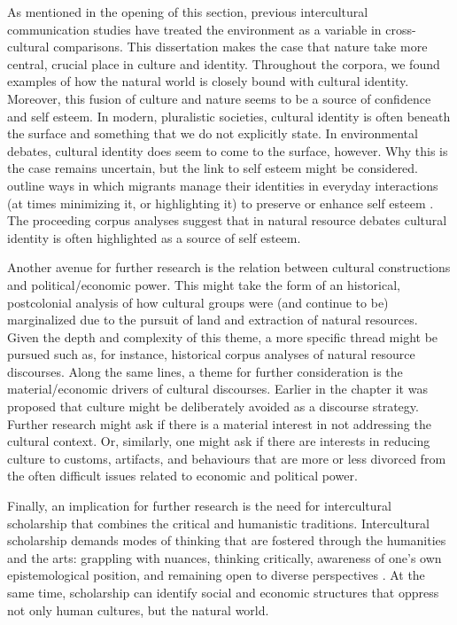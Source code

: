As mentioned in the opening of this section, previous intercultural communication studies have treated the environment as a variable in cross-cultural comparisons. This dissertation makes the case that nature take more central, crucial place in culture and identity. Throughout the corpora, we found examples of how the natural world is closely bound with cultural identity. Moreover, this fusion of culture and nature seems to be a source of confidence and self esteem. In modern, pluralistic societies, cultural identity is often beneath the surface and something that we do not explicitly state. In environmental debates, cultural identity does seem to come to the surface, however. Why this is the case remains uncertain, but the link to self esteem might be considered. \cite{camilleri1990stratégies} outline ways in which migrants manage their identities in everyday interactions (at times minimizing it, or highlighting it) to preserve or enhance self esteem \citep{Frame2014}. The proceeding corpus analyses suggest that in natural resource debates cultural identity is often highlighted as a source of self esteem.

Another avenue for further research is the relation between cultural constructions and political/economic power. This might take the form of an historical, postcolonial analysis of how cultural groups were (and continue to be) marginalized due to the pursuit of land and extraction of natural resources. Given the depth and complexity of this theme, a more specific thread might be pursued such as, for instance, historical corpus analyses of natural resource discourses. Along the same lines, a theme for further consideration is the material/economic drivers of cultural discourses. Earlier in the chapter it was proposed that culture might be deliberately avoided as a discourse strategy. Further research might ask if there is a material interest in not addressing the cultural context. Or, similarly, one might ask if there are interests in reducing culture to customs, artifacts, and behaviours that are more or less divorced from the often difficult issues related to economic and political power. 

Finally, an implication for further research is the need for intercultural scholarship that combines the critical and humanistic traditions. Intercultural scholarship demands modes of thinking that are fostered through the humanities and the arts: grappling with nuances, thinking critically, awareness of one's own epistemological position, and remaining open to diverse perspectives \citep{Nussbaum1997a,Nussbaum2010a}. At the same time, scholarship can identify social and economic structures that oppress not only human cultures, but the natural world. 
 